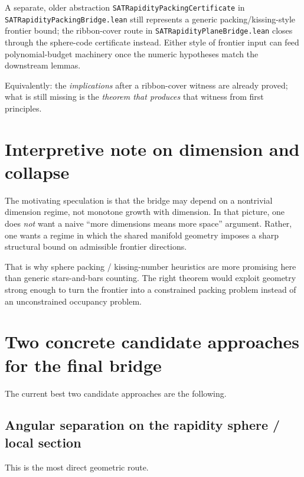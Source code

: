 \documentclass[11pt]{article}
\begin{document}
\noindent
A separate, older abstraction \texttt{SATRapidityPackingCertificate} in
\texttt{SATRapidityPackingBridge.lean} still represents a generic packing/kissing-style frontier
bound; the ribbon-cover route in \texttt{SATRapidityPlaneBridge.lean} closes through the
sphere-code certificate instead.  Either style of frontier input can feed polynomial-budget
machinery once the numeric hypotheses match the downstream lemmas.

\medskip
\noindent
Equivalently: the \emph{implications} after a ribbon-cover witness are already proved; what is
still missing is the \emph{theorem that produces} that witness from first principles.

\section{Interpretive note on dimension and collapse}

The motivating speculation is that the bridge may depend on a nontrivial dimension regime,
not monotone growth with dimension. In that picture, one does \emph{not} want a naive
``more dimensions means more space'' argument. Rather, one wants a regime in which the
shared manifold geometry imposes a sharp structural bound on admissible frontier directions.

That is why sphere packing / kissing-number heuristics are more promising here than generic
stars-and-bars counting. The right theorem would exploit geometry strong enough to turn the
frontier into a constrained packing problem instead of an unconstrained occupancy problem.

\section{Two concrete candidate approaches for the final bridge}

The current best two candidate approaches are the following.

\subsection{Angular separation on the rapidity sphere / local section}

This is the most direct geometric route.
\end{document}
